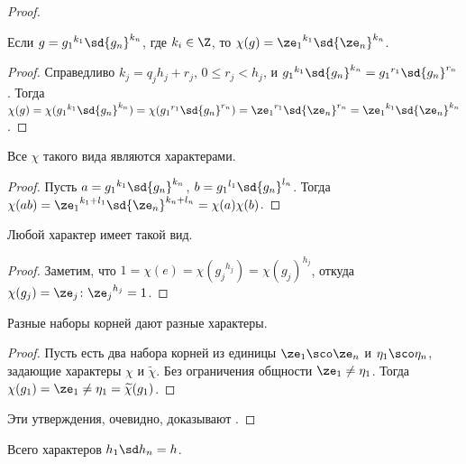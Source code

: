 \begin{proof}

  \begin{stm}
    Если $g = {g_1}^{k_1} \sd {g_n}^{k_n}$, где $k_i \in \Z$, 
		то $\chi(g) = {\ze_1}^{k_1} \sd {\ze_n}^{k_n}$.
  \end{stm}

  \begin{proof}
	Справедливо $k_j=q_jh_j+r_j,\,0\le r_j < h_j$, и 
	${g_1}^{k_1}\sd{g_n}^{k_n}={g_1}^{r_1}\sd{g_n}^{r_n}$. Тогда $\chi(g)=
	\chi({g_1}^{k_1}\sd{g_n}^{k_n})=\chi({g_1}^{r_1}\sd{g_n}^{r_n})=
	{\ze_1}^{r_1}\sd{\ze_n}^{r_n}={\ze_1}^{k_1}\sd{\ze_n}^{k_n}$.
  \end{proof}

	\begin{imp}
  Все $\chi$ такого вида являются характерами.
	\end{imp}

	\begin{proof}
	Пусть $a={g_1}^{k_1}\sd{g_n}^{k_n}$, $b={g_1}^{l_1}\sd{g_n}^{l_n}$.
	Тогда $\chi(ab)={\ze_1}^{k_1+l_1}\sd{\ze_n}^{k_n+l_n}=\chi(a)\chi(b)$.
	\end{proof}
	
	\begin{stm}
	Любой характер имеет такой вид.
	\end{stm}

	\begin{proof}
	Заметим, что $1=\chi(e)=\chi({g_j}^{h_j})=\chi(g_j)^{h_j}$, откуда 
	$\chi(g_j)=\ze_j\colon{\ze_j}^{h_j}=1$.
	\end{proof}

	\begin{stm}
	Разные наборы корней дают разные характеры.
	\end{stm}

	\begin{proof}
	Пусть есть два набора корней из единицы $\ze_1\sco\ze_n$ и 
	$\eta_1\sco\eta_n$, задающие характеры $\chi$ и $\widetilde{\chi}$.
	Без ограничения общности $\ze_1\not=\eta_1$. Тогда $\chi(g_1)=\ze_1\not=
	\eta_1=\widetilde\chi(g_1)$.
	\end{proof}
 	
	Эти утверждения, очевидно, доказывают .
\end{proof}

\begin{imp}
Всего характеров $h_1\sd h_n=h$.
\end{imp}

